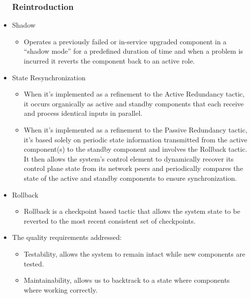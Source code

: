 \documentclass[12pt, oneside]{article}
\begin{document}
\begin{itemize}
		\subsubsection{Reintroduction}
		\item Shadow
		\begin{itemize}
		\item Operates a previously failed or in-service upgraded component in a “shadow mode” for a predefined duration of time and when a problem is incurred it reverts the component back to an active role.
		\end{itemize}
		
		\item State Resynchronization 
		\begin{itemize}
		\item When it's implemented as a refinement to the Active Redundancy tactic, it occurs organically as active and standby components that each receive and process identical inputs in parallel.
		\item When it's implemented as a refinement to the Passive Redundancy tactic, it's based solely on periodic state information transmitted from the active component(s) to the standby component and involves the Rollback tactic.
		It then allows the system's control element to dynamically recover its control plane state from its network peers and periodically compares the state of the active and standby components to ensure synchronization.
		\end{itemize}
		
		\item Rollback
		\begin{itemize}
		\item Rollback is a checkpoint based tactic that allows the system state to be reverted to the most recent consistent set of checkpoints.
		\end{itemize}
		
		\item The quality requirements addressed:
		\begin{itemize}
			\item Testability, allows the system to remain intact while new components are tested.
			\item Maintainability, allows us to backtrack to a state where components where working correctly.
		\end{itemize}
		
	\end{itemize}
	
\end{document}
